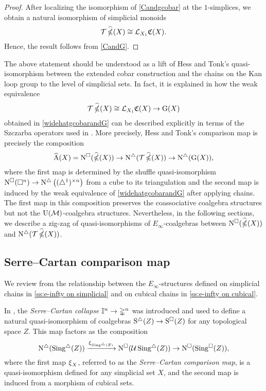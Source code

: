 \begin{proof}
	After localizing the isomorphism of \cref{Candgcobar} at the $1$-simplices, we obtain a natural isomorphism of simplicial monoids
	\[
	\operatorname{\mathcal{T}} \operatorname{\widehat{\mathbb{\Omega}}}(X) \cong \operatorname{\mathcal{L}}_{X_1} \! \operatorname{\mathfrak{C}}(X).
	\]
	Hence, the result follows from \cref{CandG}.
\end{proof}

 The above statement should be understood as a lift of Hess and Tonk's quasi-isomorphism between the extended cobar construction and the chains on the Kan loop group to the level of simplicial sets.
In fact, it is explained in \cite{minichello2021path} how the weak equivalence
\[
\operatorname{\mathcal{T}} \operatorname{\widehat{\mathbb{\Omega}}}(X) \cong \mathcal{L}_{X_1} \! \operatorname{\mathfrak{C}}(X) \to \operatorname{G}(X)
\]
obtained in \cref{widehatgcobarandG}
 can be described explicitly in terms of the Szczarba operators used in \cite{hess2010cobar}.
More precisely, Hess and Tonk's comparison map is precisely the composition
\[
\operatorname{\widehat{A}}(X) = \operatorname{N^{\square}}(\operatorname{\widehat{\mathbb{\Omega}}}(X)) \to \operatorname{N^{\triangle}}(\operatorname{\mathcal{T}}\operatorname{\widehat{\mathbb{\Omega}}}(X)) \to \operatorname{N^{\triangle}} (\operatorname{G}(X)),
\]
where the first map is determined by the shuffle quasi-isomorphism
$\operatorname{N^{\square}}(\square^n)\to \operatorname{N^{\triangle}} \big( (\triangle^1)^{\times n} \big)$ from a cube to its triangulation and the second map is induced by the weak equivalence of \cref{widehatgcobarandG} after applying chains.
The first map in this composition preserves the coassociative coalgebra structures but not the ${\operatorname{U}(\mathcal{M})}$-coalgebra structures.
Nevertheless, in the following sections, we describe a zig-zag of quasi-isomorphisms of $E_{\infty}$-coalgebras between $\operatorname{N^{\square}}(\operatorname{\widehat{\mathbb{\Omega}}}(X))$ and $\operatorname{N^{\triangle}}(\operatorname{\mathcal{T}}\operatorname{\widehat{\mathbb{\Omega}}}(X))$.

\subsection{Serre--Cartan comparison map}

We review from \cite{medina2021cubical} the relationship between the $E_\infty$-structures defined on simplicial chains in \cref{ss:e-infty on simplicial} and on cubical chains in \cref{ss:e-infty on cubical}.

In \cite[p.442]{serre1951homologie}, the \textit{Serre--Cartan collapse} $\mathbb{I}^n \to \mathbb{\Delta}^n$ was introduced and used to define a natural quasi-isomorphism of coalgebras $\operatorname{S^{\triangle}}(Z) \to \operatorname{S^{\square}}(Z)$ for any topological space $Z$.
This map factors as the composition
\[
\operatorname{N^{\triangle}}(\operatorname{Sing^{\triangle}}(Z)) \xrightarrow{\operatorname{\xi}_{\operatorname{Sing^{\triangle}}(Z)}}
\operatorname{N^{\square}}(\mathcal{U} \operatorname{Sing^{\triangle}}(Z)) \to
\operatorname{N^{\square}}(\operatorname{Sing^{\square}}(Z)),
\]
where the first map $\operatorname{\xi}_X$, referred to as the \textit{Serre--Cartan comparison map}, is a quasi-isomorphism defined for any simplicial set $X$, and the second map is induced from a morphism of cubical sets.

